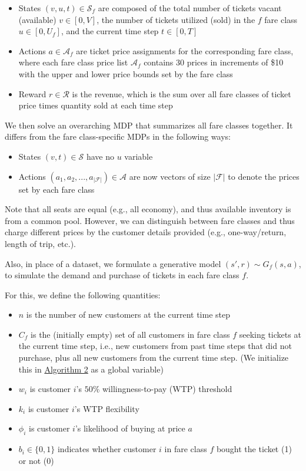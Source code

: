 \documentclass[10pt,letterpaper]{article}
\begin{document}
\begin{multicols*}{2}
\begin{itemize}
    \item States $(v, u, t) \in \mathcal{S}_f$ are composed of the total number of tickets vacant (available) $v \in [0,V]$, the number of tickets utilized (sold) in the $f$ fare class $u \in [0,U_f]$, and the current time step $t \in [0,T]$
    \item Actions $a \in \mathcal{A}_f$ are ticket price assignments for the corresponding fare class, where each fare class price list $\mathcal{A}_f$ contains 30 prices in increments of \$10 with the upper and lower price bounds set by the fare class
    \item Reward $r \in \mathcal{R}$ is the revenue, which is the sum over all fare classes of ticket price times quantity sold at each time step
\end{itemize}

We then solve an overarching MDP that summarizes all fare classes together. It differs from the fare class-specific MDPs in the following ways:

\begin{itemize}
    \item States $(v, t) \in \mathcal{S}$ have no $u$ variable
    \item Actions $(a_1,a_2,...,a_{|\mathcal{F}|}) \in \mathcal{A}$ are now vectors of size $|\mathcal{F}|$ to denote the prices set by each fare class
\end{itemize}

Note that all seats are equal (e.g., all economy), and thus available inventory is from a common pool. However, we can distinguish between fare classes and thus charge different prices by the customer details provided (e.g., one-way/return, length of trip, etc.).

Also, in place of a dataset, we formulate a generative model $(s',r) \sim G_f(s,a)$, to simulate the demand and purchase of tickets in each fare class $f$.

For this, we define the following quantities:
\begin{itemize}
    \item $n$ is the number of new customers at the current time step
    \item $C_f$ is the (initially empty) set of all customers in fare class $f$ seeking tickets at the current time step, i.e., new customers from past time steps that did not purchase, plus all new customers from the current time step. (We initialize this in \hyperref[alg:solve-mdp]{Algorithm 2} as a global variable)
    \item $w_i$ is customer $i$'s $50 \%$ willingness-to-pay (WTP) threshold
    \item $k_i$ is customer $i$'s WTP flexibility
    \item $\phi_i$ is customer $i$'s likelihood of buying at price $a$
    \item $b_i \in \{ 0,1 \}$ indicates whether customer $i$ in fare class $f$ bought the ticket (1) or not (0)
\end{itemize}


\end{multicols*}
\end{document}
